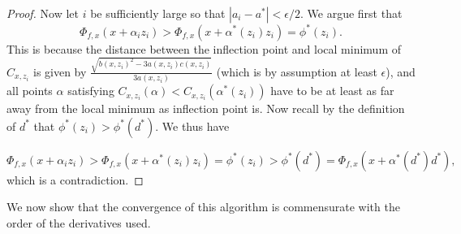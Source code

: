 \documentclass[11pt]{article}
\theoremstyle{plain}
\theoremstyle{definition}
\theoremstyle{remark}
\begin{document}
\begin{proof}
Now let $i$ be sufficiently large so that $|a_i - a^*| < \epsilon/2$. We argue first that 
$$\Phi_{f,x}(x + \alpha_iz_i) > \Phi_{f,x}(x+\alpha^*(z_i)z_i) = \phi^*(z_i).$$
This is because the distance between the inflection point and local minimum of $C_{x,z_i}$ is given by $\frac{\sqrt{b(x,z_i)^2 - 3a(x,z_i)c(x,z_i)}}{3a(x,z_i)}$ (which is by assumption at least $\epsilon$), and all points $\alpha$ satisfying $C_{x,z_i}(\alpha) < C_{x,z_i}(\alpha^*(z_i))$ have to be at least as far away from the local minimum as inflection point is. Now recall by the definition of $d^*$ that $\phi^*(z_i) > \phi^*(d^*)$. We thus have

$$\Phi_{f,x}(x + \alpha_iz_i) > \Phi_{f,x}(x+\alpha^*(z_i)z_i) = \phi^*(z_i) > \phi^*(d^*) = \Phi_{f,x}(x + \alpha^*(d^*)d^*),$$
which is a contradiction.
\end{proof}

We now show that the convergence of this algorithm is commensurate with the order of the derivatives used.
\end{document}
